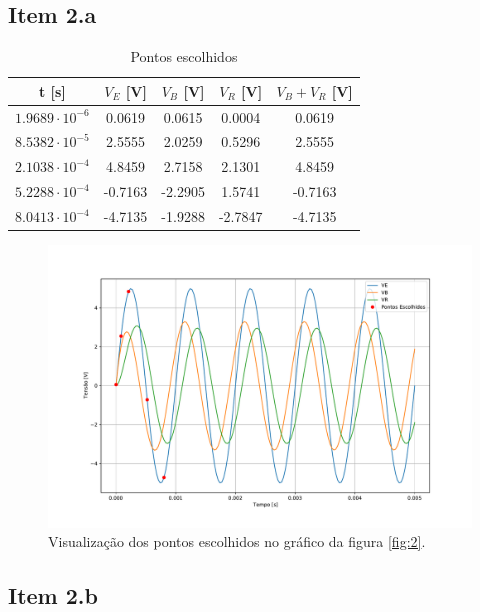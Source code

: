 \documentclass[11pt]{article}
\begin{document}
\subsection*{Item 2.a}

\begin{table}[h!]
  \centering
  \begin{tabular}{|c|c|c|c|c|}
    \hline
    t [s]                  & $V_{E}$ [V] & $V_{B}$ [V] & $V_{R}$ [V] & $V_{B} + V_{R}$ [V] \\
    \hline
    $1.9689 \cdot 10^{-6}$ & 0.0619      & 0.0615      & 0.0004      & 0.0619              \\
    $8.5382 \cdot 10^{-5}$ & 2.5555      & 2.0259      & 0.5296      & 2.5555              \\
    $2.1038 \cdot 10^{-4}$ & 4.8459      & 2.7158      & 2.1301      & 4.8459              \\
    $5.2288 \cdot 10^{-4}$ & -0.7163     & -2.2905     & 1.5741      & -0.7163             \\
    $8.0413 \cdot 10^{-4}$ & -4.7135     & -1.9288     & -2.7847     & -4.7135             \\
    \hline
  \end{tabular}
  \caption{Pontos escolhidos}
\end{table}

\begin{figure}[h!]
  \centering
  \includegraphics[width=.9\textwidth]{fig/2a}
  \caption{Visualização dos pontos escolhidos no gráfico da figura \ref{fig:2}.}
\end{figure}

\subsection*{Item 2.b}
\end{document}
